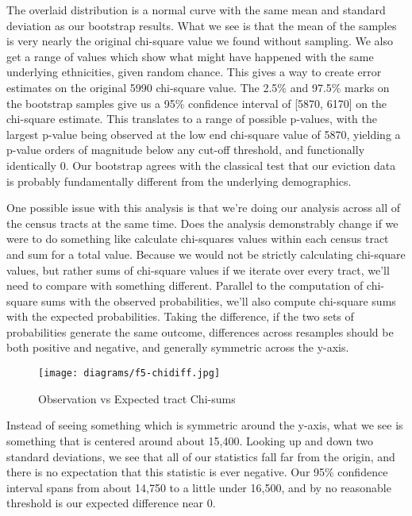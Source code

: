 \par The overlaid distribution is a normal curve with the same mean and standard deviation as our bootstrap results.  What we see is that the mean of the samples is very nearly the original chi-square value we found without sampling.  We also get a range of values which show what might have happened with the same underlying ethnicities, given random chance.  This gives a way to create error estimates on the original 5990 chi-square value.  The 2.5\% and 97.5\% marks on the bootstrap samples give us a 95\% confidence interval of [5870, 6170] on the chi-square estimate.  This translates to a range of possible p-values, with the largest p-value being observed at the low end chi-square value of 5870, yielding a p-value orders of magnitude below any cut-off threshold, and functionally identically 0.  Our bootstrap agrees with the classical test that our eviction data is probably fundamentally different from the underlying demographics.

\par One possible issue with this analysis is that we’re doing our analysis across all of the census tracts at the same time.  Does the analysis demonstrably change if we were to do something like calculate chi-squares values within each census tract and sum for a total value.  Because we would not be strictly calculating chi-square values, but rather sums of chi-square values if we iterate over every tract, we’ll need to compare with something different.  Parallel to the computation of chi-square sums with the observed probabilities, we’ll also compute chi-square sums with the expected probabilities.  Taking the difference, if the two sets of probabilities generate the same outcome, differences across resamples should be both positive and negative, and generally symmetric across the y-axis.

\begin{wrapfigure}{r}{2in}
\texttt{[image: diagrams/f5-chidiff.jpg]}
\caption{Observation vs Expected tract Chi-sums}
\label{fig:figure5}
\end{wrapfigure}

\par Instead of seeing something which is symmetric around the y-axis, what we see is something that is centered around about 15,400.  Looking up and down two standard deviations, we see that all of our statistics fall far from the origin, and there is no expectation that this statistic is ever negative.  Our 95\% confidence interval spans from about 14,750 to a little under 16,500, and by no reasonable threshold is our expected difference near 0.

